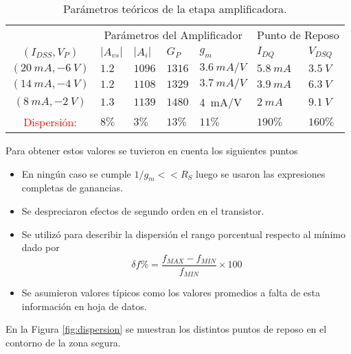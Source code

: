 \documentclass[a4paper, 10pt, spanish]{article}
\begin{document}
\begin{table}[h]
\centering
\begin{tabularx}{1\textwidth}{XXXXXXXX}
\hline
\multicolumn{2}{c}{}				& \multicolumn{4}{c}{Parámetros del Amplificador}						& \multicolumn{2}{c}{Punto de Reposo} \\
									\cmidrule(r){3-6}														\cmidrule(r){7-8}
\multicolumn{2}{c}{$(I_{DSS},V_{P})$}& $|A_{vs}|$  		& $|A_{i}|$ 		& $G_P$ 			& $g_m$ 		& $I_{DQ}$ 			& $V_{DSQ}$			\\
\cmidrule(r){1-2}  									\cmidrule(r){3-3} \cmidrule(r){4-4} 	\cmidrule(r){5-5} 	\cmidrule(r){6-6} \cmidrule(r){7-7} 	\cmidrule(r){8-8}
\multicolumn{2}{c}{$(20\ mA,-6\ V)$}& $1.2$	& $1096$	& $1316$ & $3.6\ mA/V$ & $5.8\ mA$& $3.5\ V$\\
\hline
\multicolumn{2}{c}{$(14\ mA,-4\ V)$}& $1.2$	& $1108$	& $1329$ & $3.7\ mA/V$& $3.9\ mA$ & $6.3\ V$\\
\hline
\multicolumn{2}{c}{$$(8\ mA,-2\ V)$$}&$1.3$	& $1139$	& $1480$ & 4\ mA/V & $2\ mA$ & $9.1\ V$ \\
\hline
\hline
\multicolumn{2}{c}{\textcolor{red}{Dispersión:}} & $8\%$ & $3\%$ & $13\%$ & $11\%$ & $190\%$ & $160\% $\\
\hline
\end{tabularx}
\caption{Parámetros teóricos de la etapa amplificadora.}
\label{tab:dispersion}
\end{table}

Para obtener estos valores se tuvieron en cuenta los siguientes puntos

\begin{itemize}
	\item En ningún caso se cumple $1/g_m << R_S$ luego se usaron las expresiones completas de ganancias.
	\item Se despreciaron efectos de segundo orden en el transistor.
	\item Se utilizó para describir la dispersión el rango porcentual respecto al mínimo dado por
		\begin{equation}
		\delta f \% = \frac{f_{MAX}-f_{MIN}}{f_{MIN}}\times 100 \nonumber
		\end{equation}
	\item Se asumieron valores típicos como los valores promedios a falta de esta información en hoja de datos.

	\end{itemize}


En la Figura \ref{fig:dispersion} se muestran los distintos puntos de reposo en el contorno de la zona segura.
\end{document}

